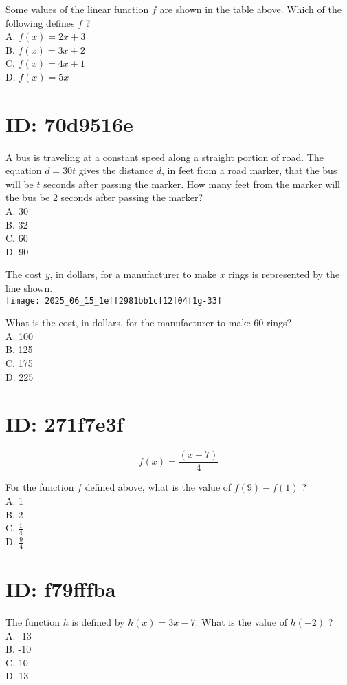Some values of the linear function $f$ are shown in the table above. Which of the following defines $f$ ?\\
A. $f(x)=2 x+3$\\
B. $f(x)=3 x+2$\\
C. $f(x)=4 x+1$\\
D. $f(x)=5 x$

\section*{ID: 70d9516e}
A bus is traveling at a constant speed along a straight portion of road. The equation $d=30 t$ gives the distance $d$, in feet from a road marker, that the bus will be $t$ seconds after passing the marker. How many feet from the marker will the bus be 2 seconds after passing the marker?\\
A. 30\\
B. 32\\
C. 60\\
D. 90

The cost $y$, in dollars, for a manufacturer to make $x$ rings is represented by the line shown.\\
\texttt{[image: 2025\_06\_15\_1eff2981bb1cf12f04f1g-33]}

What is the cost, in dollars, for the manufacturer to make 60 rings?\\
A. 100\\
B. 125\\
C. 175\\
D. 225

\section*{ID: 271f7e3f}
$$
f(x)=\frac{(x+7)}{4}
$$

For the function $f$ defined above, what is the value of $f(9)-f(1)$ ?\\
A. 1\\
B. 2\\
C. $\frac{1}{4}$\\
D. $\frac{9}{4}$

\section*{ID: f79fffba}
The function $h$ is defined by $h(x)=3 x-7$. What is the value of $h(-2)$ ?\\
A. -13\\
B. -10\\
C. 10\\
D. 13

